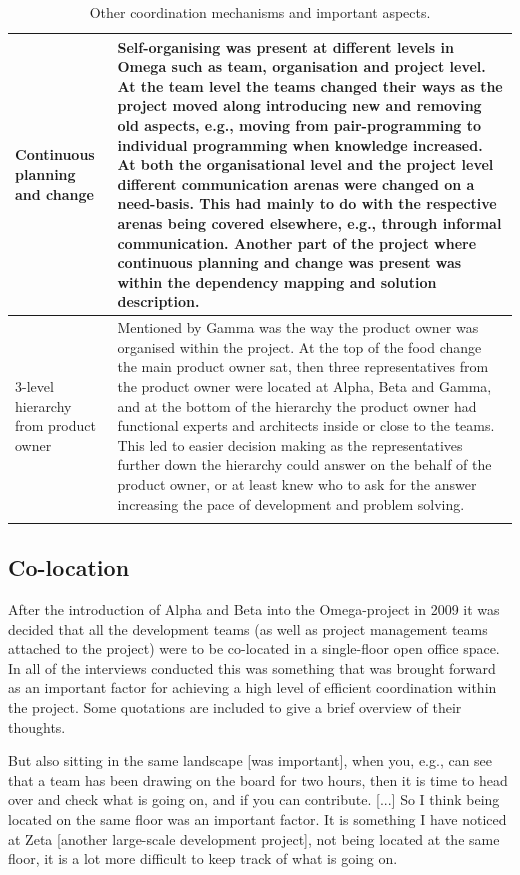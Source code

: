 \begin{center}
\begin{longtable}{| p{6cm} | p{9cm} |}
    Continuous planning and change & Self-organising was present at different levels in Omega such as team, organisation and project level. At the team level the teams changed their ways as the project moved along introducing new and removing old aspects, e.g., moving from pair-programming to individual programming when knowledge increased. At both the organisational level and the project level different communication arenas were changed on a need-basis. This had mainly to do with the respective arenas being covered elsewhere, e.g., through informal communication. Another part of the project where continuous planning and change was present was within the dependency mapping and solution description. \\ \hline
    3-level hierarchy from product owner & Mentioned by Gamma was the way the product owner was organised within the project. At the top of the food change the main product owner sat, then three representatives from the product owner were located at Alpha, Beta and Gamma, and at the bottom of the hierarchy the product owner had functional experts and architects inside or close to the teams. This led to easier decision making as the representatives further down the hierarchy could answer on the behalf of the product owner, or at least knew who to ask for the answer increasing the pace of development and problem solving. \\ \hline

    \caption{Other coordination mechanisms and important aspects.}
    \label{ocmaia}
    \end{longtable}
\end{center}

\subsection{Co-location}

After the introduction of Alpha and Beta into the Omega-project in 2009 it was decided that all the development teams (as well as project management teams attached to the project) were to be co-located in a single-floor open office space. In all of the interviews conducted this was something that was brought forward as an important factor for achieving a high level of efficient coordination within the project. Some quotations are included to give a brief overview of their thoughts.

\begin{fancyquotes}
But also sitting in the same landscape [was important], when you, e.g., can see that a team has been drawing on the board for two hours, then it is time to head over and check what is going on, and if you can contribute. [...] So I think being located on the same floor was an important factor. It is something I have noticed at Zeta [another large-scale development project], not being located at the same floor, it is a lot more difficult to keep track of what is going on. 
\end{fancyquotes}

